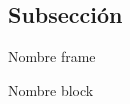 \subsection{Subsección}
\begin{frame}{Nombre frame}
	\begin{block}{Nombre block}

	\end{block}

\end{frame}

